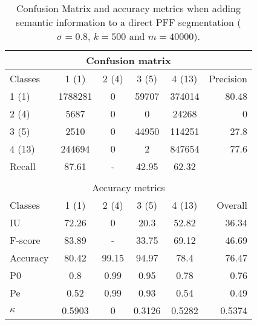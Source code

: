 \begin{table}[H]
\begin{center}
\footnotesize
\begin{tabular}{|l|c|c|c|c|r|}
\hline
\multicolumn{6}{|c|}{Confusion matrix} \\
\hline
 Classes & 1 (1) & 2 (4) & 3 (5) & 4 (13) & Precision \\
\hline
1 (1) & 1788281 & 0 & 59707 & 374014 & 80.48 \\
\hline
2 (4) & 5687 & 0 & 0 & 24268 & 0 \\
\hline
3 (5) & 2510 & 0 & 44950 & 114251 & 27.8 \\
\hline
4 (13) & 244694 & 0 & 2 & 847654 & 77.6 \\
\hline
Recall & 87.61 & - & 42.95 & 62.32 &  \\
\hline
\multicolumn{6}{c}{ } \\
\hline
\multicolumn{6}{|c|}{Accuracy metrics} \\
\hline
 Classes & 1 (1) & 2 (4) & 3 (5) & 4 (13) & Overall \\
\hline
IU & 72.26 & 0 & 20.3 & 52.82 & 36.34 \\
\hline
F-score & 83.89 & - & 33.75 & 69.12 & 46.69 \\
\hline
Accuracy & 80.42 & 99.15 & 94.97 & 78.4 & 76.47 \\
\hline
P0 & 0.8 & 0.99 & 0.95 & 0.78 & 0.76 \\
\hline
Pe & 0.52 & 0.99 & 0.93 & 0.54 & 0.49 \\
\hline
$\kappa$ & 0.5903 & 0 & 0.3126 & 0.5282 & 0.5374 \\
\hline
\end{tabular}
\caption{Confusion Matrix and accuracy metrics when adding semantic information to a direct PFF segmentation ($\sigma=0.8$, $k=500$ and $m=40000$).}
\label{table:C3_S2_seg_PFF_z}
\end{center}
\end{table}